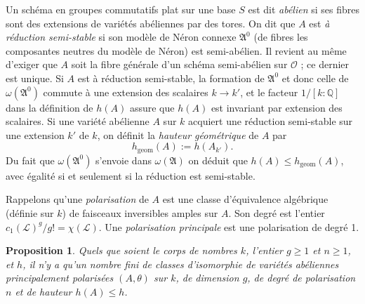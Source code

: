 \documentclass[12pt,a4paper]{article}
\theoremstyle{plain}
\newtheorem{proposition}[theorem]{Proposition}
\theoremstyle{definition}
\theoremstyle{remark}
\newcommand{\QQ}{\mathbb{Q}}
\newcommand{\cO}{\mathcal{O}}
\newcommand{\cL}{\mathcal{L}}
\newcommand{\fA}{\mathfrak{A}}
\providecommand{\QQ}{\mathbb{Q}}
\providecommand{\cL}{\mathcal{L}}
\providecommand{\cO}{\mathcal{O}}
\providecommand{\fA}{\mathfrak{A}}
\begin{document}
Un schéma en groupes commutatifs plat sur une base $S$ est dit \emph{abélien} si ses fibres sont des extensions de variétés abéliennes par des tores. On dit que $A$ est \emph{à réduction semi-stable} si son modèle de Néron connexe $\fA^0$ (de fibres les composantes neutres du modèle de Néron) est semi-abélien. Il revient au même d'exiger que $A$ soit la fibre générale d'un schéma semi-abélien sur $\cO$ ; ce dernier est unique. Si $A$ est à réduction semi-stable, la formation de $\fA^0$ et donc celle de $\omega(\fA^0)$ commute à une extension des scalaires $k \to k'$, et le facteur $1/[k:\QQ]$ dans la définition de $h(A)$ assure que $h(A)$ est invariant par extension des scalaires. Si une variété abélienne $A$ sur $k$ acquiert une réduction semi-stable sur une extension $k'$ de $k$, on définit la \emph{hauteur géométrique} de $A$ par
\[
h_{\text{geom}}(A) := h(A_{k'}).
\]
Du fait que $\omega(\fA^0)$ s'envoie dans $\omega(\fA)$ on déduit que $h(A) \leq h_{\text{geom}}(A)$, avec égalité si et seulement si la réduction est semi-stable.

Rappelons qu'une \emph{polarisation} de $A$ est une classe d'équivalence algébrique (définie sur $k$) de faisceaux inversibles amples sur $A$. Son degré est l'entier $c_1(\cL)^g/g! = \chi(\cL)$. Une \emph{polarisation principale} est une polarisation de degré 1.

\begin{proposition}
Quels que soient le corps de nombres $k$, l'entier $g \geq 1$ et $n \geq 1$, et $h$, il n'y a qu'un nombre fini de classes d'isomorphie de variétés abéliennes principalement polarisées $(A,\theta)$ sur $k$, de dimension $g$, de degré de polarisation $n$ et de hauteur $h(A) \leq h$.
\end{proposition}
\end{document}
